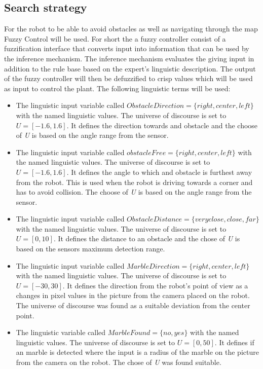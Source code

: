 \documentclass[../Head/Main.tex]{subfiles}
\begin{document}
\subsection{Search strategy}

For the robot to be able to avoid obstacles as well as navigating through the map Fuzzy Control will be used. For short the a fuzzy controller consist of a fuzzification interface that converts input into information that can be used by the inference mechanism. The inference mechanism evaluates the giving input in addition to the rule base based on the expert's linguistic description. The output of the fuzzy controller will then be defuzzified to crisp values which will be used as input to control the plant. The following linguistic terms will be used:

\begin{itemize}
\item The linguistic input variable called $ObstacleDirection = \{right, center, left\}$ with the named linguistic values. The universe of discourse is set to ${U} = [-1.6, 1.6]$. It defines the direction towards and obstacle and the choose of \textit{U} is based on the angle range from the sensor.   
\item The linguistic input variable called $obstacleFree = \{right, center, left\}$ with the named linguistic values. The universe of discourse is set to ${U} = [-1.6, 1.6]$. It defines the angle to which and obstacle is furthest away from the robot. This is used when the robot is driving towards a corner and has to avoid collision. The choose of \textit{U} is based on the angle range from the sensor.
\item The linguistic input variable called $ObstacleDistance = \{veryclose, close, far\}$ with the named linguistic values.  The universe of discourse is set to ${U} = [0, 10]$. It defines the distance to an obstacle and the chose of \textit{U} is based on the sensors maximum detection range.
\item The linguistic input variable called $MarbleDirection = \{right, center, left\}$ with the named linguistic values. The universe of discourse is set to ${U} = [-30, 30]$. It defines the direction from the robot's point of view as a changes in pixel values in the picture from the camera placed on the robot. The universe of discourse was found as a suitable deviation from the center point.
\item The linguistic variable called $MarbleFound = \{no, yes\}$ with the named linguistic values.  The universe of discourse is set to ${U} = [0, 50]$. It defines if an marble is detected where the input is a radius of the marble on the picture from the camera on the robot. The chose of \textit{U} was found suitable. 

\end{itemize}
\end{document}
